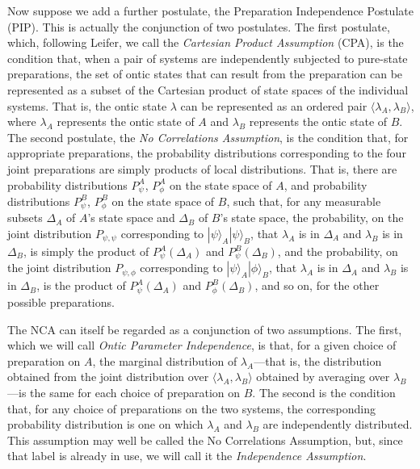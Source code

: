 \documentclass[12pt]{article}
\newcommand{\ket}[1]{|#1\rangle}
\begin{document}
Now suppose we add a further postulate, the Preparation Independence Postulate (PIP).  This is actually the conjunction of two postulates.  The first postulate, which, following Leifer, we call the \emph{Cartesian Product Assumption}  (CPA), is  the condition that, when a pair of systems are independently subjected to pure-state preparations, the set of ontic states that can result from the preparation can be represented as a subset of the Cartesian product of state spaces of the individual systems.  That is, the ontic state $\lambda$ can be represented as an ordered pair $\langle \lambda_A, \lambda_B \rangle$, where $\lambda_A$ represents the ontic state of $A$ and $\lambda_B$ represents the ontic state of $B$.  The second postulate, the \emph{No Correlations Assumption},  is the condition that, for appropriate preparations,  the probability distributions corresponding to the four joint preparations are simply products of local distributions. That is, there are probability distributions $P_\psi^A$,  $P_\phi^A$ on the state space of $A$, and probability distributions $P_\psi^B$,  $P_\phi^B$ on the state space of $B$, such that, for any measurable subsets $\Delta_A$ of $A$'s state space and $\Delta_B$ of $B$'s state space, the probability, on the joint distribution $P_{\psi, \psi}$ corresponding to $\ket{\psi}_A \ket{\psi}_B$, that $\lambda_A$ is in $\Delta_A$ and $\lambda_B$ is in $\Delta_B$, is simply the product of $P_\psi^A(\Delta_A)$ and $P_\psi^B(\Delta_B)$, and the probability, on the joint distribution $P_{\psi, \phi}$ corresponding to $\ket{\psi}_A \ket{\phi}_B$, that $\lambda_A$ is in $\Delta_A$ and $\lambda_B$ is in $\Delta_B$, is  the product of $P_\psi^A(\Delta_A)$ and $P_\phi^B(\Delta_B)$, and so on, for the other possible preparations.

The NCA can itself be regarded as a conjunction of two assumptions.  The first, which we will call \emph{Ontic Parameter Independence}, is that, for a given choice of preparation on $A$, the marginal distribution of $\lambda_A$---that is, the distribution obtained from the joint distribution over $\langle \lambda_A, \lambda_B \rangle$ obtained by averaging over $\lambda_B$---is the same for each choice of preparation on $B$.  The second is the condition that, for any choice of preparations on the two systems, the corresponding probability distribution is one on which $\lambda_A$ and $\lambda_B$ are independently distributed. This assumption may well be called the No Correlations Assumption, but, since that label is already in use, we will call it the \emph{Independence Assumption}.
\end{document}
